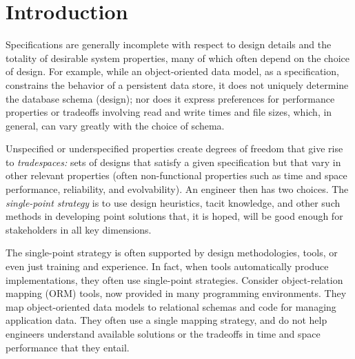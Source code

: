 \documentclass{sig-alternate}
\begin{document}
\section{Introduction}
Specifications are generally incomplete with respect to design details and the totality of desirable system properties, many of which often depend on the choice of design. For example, while an object-oriented data model, as a specification, constrains the behavior of a persistent data store, it does not uniquely determine the database schema (design); nor does it express preferences for performance properties or tradeoffs involving read and write times and file sizes, which, in general, can vary greatly with the choice of schema. 

Unspecified or underspecified properties create degrees of freedom that
give rise to {\em tradespaces:} sets of designs that satisfy a given specification but that vary in other relevant properties (often non-functional properties such as time and space performance, reliability, and evolvability). An engineer then has two choices. %
The \textit{single-point strategy} is
to use design heuristics, tacit knowledge, and other such methods in developing point solutions that, it is hoped, will be good enough for stakeholders in all key dimensions.
 

\sloppy The single-point strategy is often supported by design methodologies, tools, or even just training and experience.
In fact, when tools automatically produce implementations, they often use single-point strategies. Consider object-relation mapping (ORM) tools, now provided in many programming environments. They map object-oriented data models to relational schemas and code for managing application data. They often use a single mapping strategy, and do not help engineers understand available solutions or the tradeoffs in time and space performance that they entail.
\end{document}
